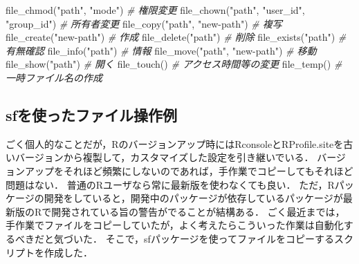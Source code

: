 \documentclass[
]{article}
\newenvironment{Shaded}{\begin{snugshade}}{\end{snugshade}}
\newcommand{\CommentTok}[1]{\textcolor[rgb]{0.56,0.35,0.01}{\textit{#1}}}
\newcommand{\FunctionTok}[1]{\textcolor[rgb]{0.00,0.00,0.00}{#1}}
\newcommand{\NormalTok}[1]{#1}
\newcommand{\StringTok}[1]{\textcolor[rgb]{0.31,0.60,0.02}{#1}}
\begin{document}
\begin{Shaded}
\begin{Highlighting}[]
\FunctionTok{file\_chmod}\NormalTok{(}\StringTok{"path"}\NormalTok{, }\StringTok{"mode"}\NormalTok{) }\CommentTok{\# 権限変更   }
\FunctionTok{file\_chown}\NormalTok{(}\StringTok{"path"}\NormalTok{, }\StringTok{"user\_id"}\NormalTok{, }\StringTok{"group\_id"}\NormalTok{) }\CommentTok{\# 所有者変更   }
\FunctionTok{file\_copy}\NormalTok{(}\StringTok{"path"}\NormalTok{, }\StringTok{"new{-}path"}\NormalTok{) }\CommentTok{\# 複写   }
\FunctionTok{file\_create}\NormalTok{(}\StringTok{"new{-}path"}\NormalTok{) }\CommentTok{\# 作成   }
\FunctionTok{file\_delete}\NormalTok{(}\StringTok{"path"}\NormalTok{) }\CommentTok{\# 削除   }
\FunctionTok{file\_exists}\NormalTok{(}\StringTok{"path"}\NormalTok{) }\CommentTok{\# 有無確認   }
\FunctionTok{file\_info}\NormalTok{(}\StringTok{"path"}\NormalTok{) }\CommentTok{\# 情報   }
\FunctionTok{file\_move}\NormalTok{(}\StringTok{"path"}\NormalTok{, }\StringTok{"new{-}path"}\NormalTok{) }\CommentTok{\# 移動   }
\FunctionTok{file\_show}\NormalTok{(}\StringTok{"path"}\NormalTok{) }\CommentTok{\# 開く   }
\FunctionTok{file\_touch}\NormalTok{() }\CommentTok{\# アクセス時間等の変更   }
\FunctionTok{file\_temp}\NormalTok{() }\CommentTok{\# 一時ファイル名の作成   }
\end{Highlighting}
\end{Shaded}

\hypertarget{sfux3092ux4f7fux3063ux305fux30d5ux30a1ux30a4ux30ebux64cdux4f5cux4f8b}{%
\subsection{sfを使ったファイル操作例}\label{sfux3092ux4f7fux3063ux305fux30d5ux30a1ux30a4ux30ebux64cdux4f5cux4f8b}}

ごく個人的なことだが，Rのバージョンアップ時にはRconsoleとRProfile.siteを古いバージョンから複製して，カスタマイズした設定を引き継いでいる．
バージョンアップをそれほど頻繁にしないのであれば，手作業でコピーしてもそれほど問題はない．
普通のRユーザなら常に最新版を使わなくても良い．
ただ，Rパッケージの開発をしていると，開発中のパッケージが依存しているパッケージが最新版のRで開発されている旨の警告がでることが結構ある．
ごく最近までは，手作業でファイルをコピーしていたが，よく考えたらこういった作業は自動化するべきだと気づいた．
そこで，sfパッケージを使ってファイルをコピーするスクリプトを作成した．
\end{document}

